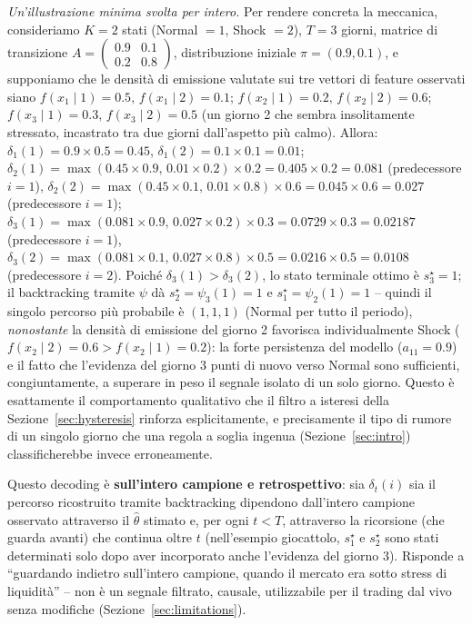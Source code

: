 \documentclass[11pt]{article}
\theoremstyle{definition}
\theoremstyle{remark}
\begin{document}
\emph{Un'illustrazione minima svolta per intero.} Per rendere concreta la meccanica, consideriamo $K=2$ stati (Normal $=1$, Shock $=2$), $T=3$ giorni, matrice di transizione $A=\left(\begin{smallmatrix}0.9&0.1\\0.2&0.8\end{smallmatrix}\right)$, distribuzione iniziale $\pi=(0.9,0.1)$, e supponiamo che le densit\`a di emissione valutate sui tre vettori di feature osservati siano $f(x_1\mid 1)=0.5,\,f(x_1\mid2)=0.1$; $f(x_2\mid1)=0.2,\,f(x_2\mid2)=0.6$; $f(x_3\mid1)=0.3,\,f(x_3\mid2)=0.5$ (un giorno 2 che sembra insolitamente stressato, incastrato tra due giorni dall'aspetto pi\`u calmo). Allora: $\delta_1(1)=0.9\times0.5=0.45$, $\delta_1(2)=0.1\times0.1=0.01$; $\delta_2(1)=\max(0.45\times0.9,\,0.01\times0.2)\times0.2=0.405\times0.2=0.081$ (predecessore $i=1$), $\delta_2(2)=\max(0.45\times0.1,\,0.01\times0.8)\times0.6=0.045\times0.6=0.027$ (predecessore $i=1$); $\delta_3(1)=\max(0.081\times0.9,\,0.027\times0.2)\times0.3=0.0729\times0.3=0.02187$ (predecessore $i=1$), $\delta_3(2)=\max(0.081\times0.1,\,0.027\times0.8)\times0.5=0.0216\times0.5=0.0108$ (predecessore $i=2$). Poich\'e $\delta_3(1)>\delta_3(2)$, lo stato terminale ottimo \`e $s_3^\star=1$; il backtracking tramite $\psi$ d\`a $s_2^\star=\psi_3(1)=1$ e $s_1^\star=\psi_2(1)=1$ -- quindi il singolo percorso pi\`u probabile \`e $(1,1,1)$ (Normal per tutto il periodo), \emph{nonostante} la densit\`a di emissione del giorno 2 favorisca individualmente Shock ($f(x_2\mid2)=0.6>f(x_2\mid1)=0.2$): la forte persistenza del modello ($a_{11}=0.9$) e il fatto che l'evidenza del giorno 3 punti di nuovo verso Normal sono sufficienti, congiuntamente, a superare in peso il segnale isolato di un solo giorno. Questo \`e esattamente il comportamento qualitativo che il filtro a isteresi della Sezione~\ref{sec:hysteresis} rinforza esplicitamente, e precisamente il tipo di rumore di un singolo giorno che una regola a soglia ingenua (Sezione~\ref{sec:intro}) classificherebbe invece erroneamente.

Questo decoding \`e \textbf{sull'intero campione e retrospettivo}: sia $\delta_t(i)$ sia il percorso ricostruito tramite backtracking dipendono dall'intero campione osservato attraverso il $\widehat\theta$ stimato e, per ogni $t<T$, attraverso la ricorsione (che guarda avanti) che continua oltre $t$ (nell'esempio giocattolo, $s_1^\star$ e $s_2^\star$ sono stati determinati solo dopo aver incorporato anche l'evidenza del giorno 3). Risponde a ``guardando indietro sull'intero campione, quando il mercato era sotto stress di liquidit\`a'' -- non \`e un segnale filtrato, causale, utilizzabile per il trading dal vivo senza modifiche (Sezione~\ref{sec:limitations}).
\end{document}
